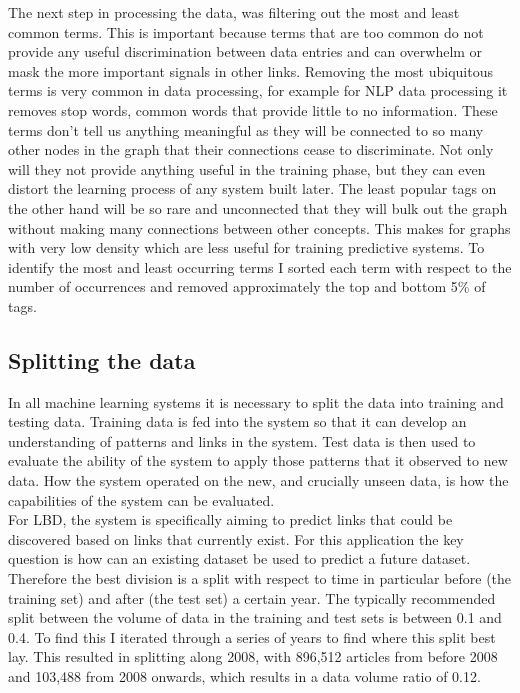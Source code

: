 \documentclass{l4proj}
\begin{document}
The next step in processing the data, was filtering out the most and least common terms. This is important because terms that are too common do not provide any useful discrimination between data entries and can overwhelm or mask the more important signals in other links. Removing the most ubiquitous terms is very common in data processing, for example for NLP data processing it removes stop words, common words that provide little to no information. These terms  don't tell us anything meaningful as they will be connected to so many other nodes in the graph that their connections cease to discriminate. Not only will they not provide anything useful in the training phase, but they can even distort the learning process of any system built later. The least popular tags on the other hand will be so rare and unconnected that they will bulk out the graph without making many connections between other concepts. This makes for graphs with very low density which are less useful for training predictive systems. To identify the most and least occurring terms I sorted each term with respect to the number of occurrences and removed approximately the top and bottom 5\% of tags.\\

\subsection{Splitting the data}

In all machine learning systems it is necessary to split the data into training and testing data. Training data is fed into the system so that it can develop an understanding of patterns and links in the system. Test data is then used to evaluate the ability of the system to apply those patterns that it observed to new data. How the system operated on the new, and crucially unseen data, is how the capabilities of the system can be evaluated. \\

For LBD, the system is specifically aiming to predict links that could be discovered based on links that currently exist. For this application the key question is how can an existing dataset be used to predict a future dataset. Therefore the best division is a split with respect to time in particular before (the training set) and after (the test set) a certain year. The typically recommended split between the volume of data in the training and test sets is between 0.1 and 0.4. To find this I iterated through a series of years to find where this split best lay. This resulted in splitting along 2008, with 896,512 articles from before 2008 and 103,488 from 2008 onwards, which results in a data volume ratio of 0.12. \\
\end{document}

